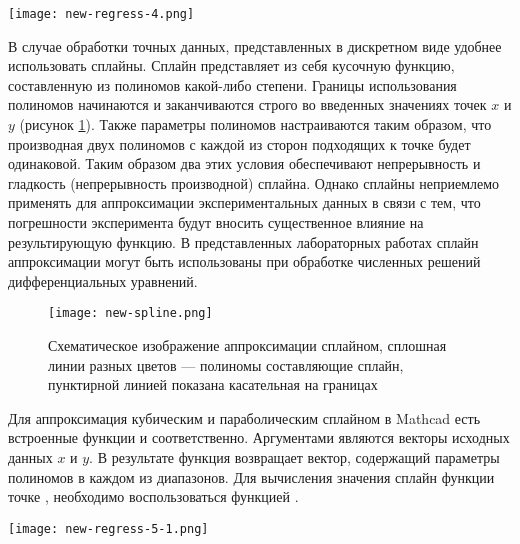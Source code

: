 
\begin{center}
	\texttt{[image: new-regress-4.png]}
\end{center}

В случае обработки точных данных, представленных в дискретном виде удобнее использовать сплайны. Сплайн представляет из себя кусочную функцию, составленную из полиномов какой-либо степени. Границы использования полиномов начинаются и заканчиваются строго во введенных значениях точек $x$ и $y$ (рисунок \ref{fig:old.regress.spline}). Также параметры полиномов настраиваются таким образом, что производная двух полиномов с каждой из сторон подходящих к точке будет одинаковой.
Таким образом два этих условия обеспечивают непрерывность и гладкость (непрерывность производной) сплайна. Однако сплайны неприемлемо применять для аппроксимации экспериментальных данных в связи с тем, что погрешности эксперимента будут вносить существенное влияние на результирующую функцию. В представленных лабораторных работах сплайн аппроксимации могут быть использованы при обработке численных решений дифференциальных уравнений.

\begin{figure}[h] %
	\begin{center} 
		\texttt{[image: new-spline.png]}
	\end{center}
	\caption{Схематическое изображение аппроксимации сплайном, сплошная линии разных цветов --- полиномы составляющие сплайн, пунктирной линией показана касательная на границах }\label{fig:old.regress.spline}
\end{figure}

Для аппроксимация кубическим и параболическим сплайном в Mathcad есть встроенные функции  и  соответственно. Аргументами являются векторы исходных данных $x$ и $y$. В результате функция возвращает вектор, содержащий параметры полиномов в каждом из диапазонов. Для вычисления значения сплайн функции точке , необходимо воспользоваться функцией .




\begin{center}
	\texttt{[image: new-regress-5-1.png]}
\end{center}

